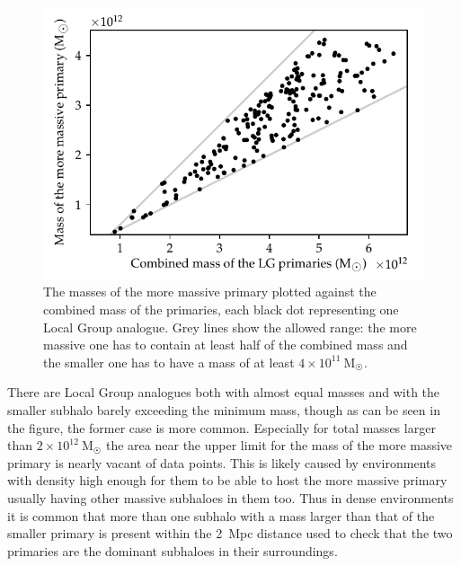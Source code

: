 \documentclass[english, twoside]{HYgradu}
\begin{document}
\begin{figure}
    \centering
    \includegraphics{kuvat/LGmasses.pdf}
    \caption{The masses of the more massive primary plotted against the combined mass of the primaries, each black dot representing one Local Group analogue. Grey lines show the allowed range: the more massive one has to contain at least half of the combined mass and the smaller one has to have a mass of at least $4 \times 10^{11}~\mathrm{M_{\astrosun}}$.}\label{fig:LGmasses}
\end{figure}

There are Local Group analogues both with almost equal masses and with the smaller subhalo barely exceeding the minimum mass, though as can be seen in the figure, the former case is more common. Especially for total masses larger than $2 \times 10^{12}~\mathrm{M_{\astrosun}}$ the area near the upper limit for the mass of the more massive primary is nearly vacant of data points. This is likely caused by environments with density high enough for them to be able to host the more massive primary usually having other massive subhaloes in them too. Thus in dense environments it is common that more than one subhalo with a mass larger than that of the smaller primary is present within the 2~Mpc distance used to check that the two primaries are the dominant subhaloes in their surroundings.
\end{document}
